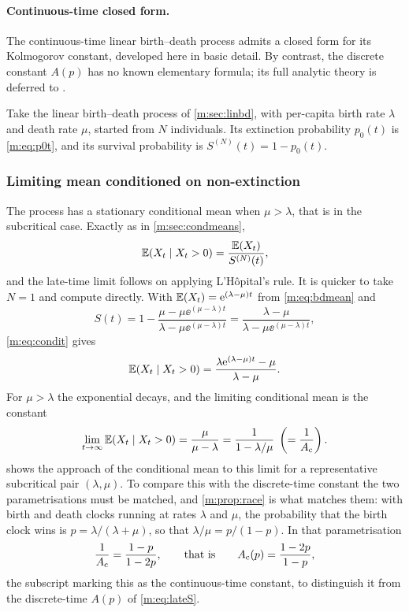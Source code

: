 \paragraph{Continuous-time closed form.}
\label{m:sec:cts}

The continuous-time linear birth--death process admits a closed form for its
Kolmogorov constant, developed here in basic detail. By contrast, the discrete
constant $A(p)$ has no known elementary formula; its full analytic theory is deferred
to \ChA.

Take the linear birth--death process of \cref{m:sec:linbd}, with per-capita birth
rate $\lambda$ and death rate $\mu$, started from $N$ individuals. Its extinction
probability $p_0(t)$ is \cref{m:eq:p0t}, and its survival probability is
$S^{(N)}(t) = 1-p_0(t)$.

\subsubsection*{Limiting mean conditioned on non-extinction}

The process has a stationary conditional mean when $\mu>\lambda$, that is in the
subcritical case. Exactly as in \cref{m:sec:condmeans},
\begin{equation}
\label{m:eq:condit}
\mathbb{E}\!\left(X_t\mid X_t>0\right) = \frac{\mathbb{E}\!\left(X_t\right)}{S^{(N)}(t)},
\end{equation}
and the late-time limit follows on applying L'Hôpital's rule. It is quicker to take
$N=1$ and compute directly. With $\mathbb{E}\!\left(X_t\right)=\mathrm{e}^{(\lambda-\mu)t}$ from
\cref{m:eq:bdmean} and
\begin{equation*}
S(t) = 1-\frac{\mu-\mu\ee^{(\mu-\lambda)t}}{\lambda-\mu\ee^{(\mu-\lambda)t}}
= \frac{\lambda-\mu}{\lambda-\mu\ee^{(\mu-\lambda)t}},
\end{equation*}
\cref{m:eq:condit} gives
\begin{equation*}
\mathbb{E}\!\left(X_t\mid X_t>0\right) = \frac{\lambda\mathrm{e}^{(\lambda-\mu)t}-\mu}{\lambda-\mu} .
\end{equation*}
For $\mu>\lambda$ the exponential decays, and the limiting conditional mean is the
constant
\begin{equation}
\label{m:eq:ctsqsmean}
\lim_{t\to\infty}\mathbb{E}\!\left(X_t\mid X_t>0\right) = \frac{\mu}{\mu-\lambda}
= \frac{1}{1-\lambda/\mu}
\;\left(=\frac{1}{A_{\mathrm{c}}}\right) .
\end{equation}
 shows the approach of the conditional mean to this limit for
a representative subcritical pair $(\lambda,\mu)$. To compare this with the
discrete-time constant the two parametrisations must be matched, and
\cref{m:prop:race} is what matches them: with birth and death clocks running at rates
$\lambda$ and $\mu$, the probability that the birth clock wins is
$p = \lambda/(\lambda+\mu)$, so that $\lambda/\mu = p/(1-p)$. In that
parametrisation
\begin{equation}
\label{m:eq:Acts}
\frac{1}{A_{\mathrm{c}}} = \frac{1-p}{1-2p},
\qquad\text{that is}\qquad
A_{\mathrm{c}}(p) = \frac{1-2p}{1-p} ,
\end{equation}
the subscript marking this as the continuous-time constant, to distinguish it from
the discrete-time $A(p)$ of \cref{m:eq:lateS}.

